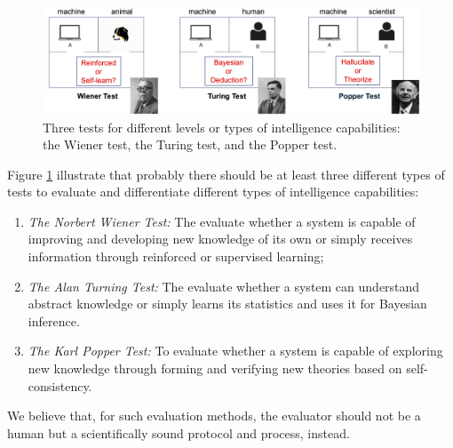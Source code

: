 \documentclass[../../book-main.tex]{subfiles}
\begin{document}
\begin{figure}[t]
    \centering
    \includegraphics[width=0.95\linewidth]{figs_chap8/tests.png}
    \caption{Three tests for different levels or types of intelligence capabilities: the Wiener test, the Turing test, and the Popper test.}
    \label{fig:three-tests}
\end{figure}

Figure \ref{fig:three-tests} illustrate that probably there should be at least three different types of tests to evaluate and differentiate different types of intelligence capabilities:
\begin{enumerate}
    \item {\em The Norbert Wiener Test:} The evaluate whether a system is capable of improving and developing new knowledge of its own or simply receives information through reinforced or supervised learning;
    \item {\em The Alan Turning Test:} The evaluate whether a system can understand abstract knowledge or simply learns its statistics and uses it for Bayesian inference.
    \item {\em The Karl Popper Test:} To evaluate whether a system is capable of exploring new knowledge through forming and verifying new theories based on self-consistency.
\end{enumerate}
We believe that, for such evaluation methods, the evaluator should not be a human but a scientifically sound protocol and process, instead.
\end{document}

